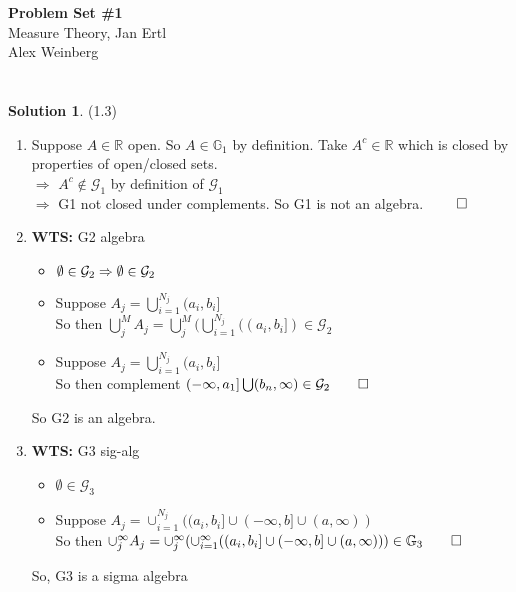 \documentclass[letterpaper,12pt]{article}
\theoremstyle{definition}
\newtheorem{solution}[theorem]{Solution}
\begin{document}
\begin{flushleft}
  \textbf{\large{Problem Set \#1}} \\
  Measure Theory, Jan Ertl \\
  Alex Weinberg
\end{flushleft}

\vspace{5mm}

\section{}
\begin{solution}(1.3)
  \begin{enumerate}
  \item
  Suppose $A \in \mathbb{R} $ open. So $A \in \mathbb{G}_1$ by definition. Take $A^c \in \mathbb{R}$ which is closed by properties of open/closed sets. \\
  $\Rightarrow$ $A^c \not \in \mathcal{G}_1$ by definition of $\mathcal{G}_1$ \\
  $\Rightarrow$ G1 not closed under complements. So G1 is not an algebra. $\qed$

  \item \textbf{WTS:} G2 algebra
  \begin{itemize}
  \item $\emptyset \in \mathcal{G}_2 \\
  \Rightarrow \emptyset \in \mathcal{G}_2 $
  \item Suppose $A_j = \bigcup_{i=1}^{N_j} (a_i,b_i] $ \\
  So then $\bigcup_j^M A_j = \bigcup_j^M (\bigcup_{i=1}^{N_j} ((a_i,b_i]) \in \mathcal{G}_2$
  \item Suppose $A_j = \bigcup_{i=1}^{N_j} (a_i,b_i] $ \\
  So then complement $(-\infty, a_1] \bigcup (b_n, \infty) \in \mathcal{G}_2 \qed$
  \end{itemize}
  So G2 is an algebra.

  \item \textbf{WTS:} G3 sig-alg
  \begin{itemize}
    \item $\emptyset \in \mathcal{G}_3$
    \item Suppose $A_j = \cup_{i=1}^{N_j} ((a_i,b_i] \cup (-\infty,b] \cup (a,\infty))$ \\
    So then $\cup_j^\infty A_j = \cup_j^\infty (\cup_{i=1}^{\infty} ((a_i,b_i] \cup (-\infty,b] \cup (a,\infty))) \in \mathbb{G}_3 \qed$
  \end{itemize}
  So, G3 is a sigma algebra
  \end{enumerate}
\end{solution}
\end{document}
